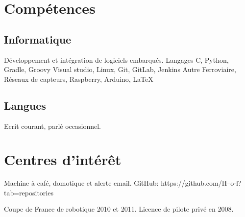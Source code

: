 \documentclass[10pt,a4paper]{moderncv}
\begin{document}
\section{Compétences}

  \subsection{Informatique}

    {Développement et intégration de logiciels embarqués.\newline{}}
    {Langages}
    {C, Python, Gradle, Groovy}
    {Visual studio, Linux, Git, GitLab, Jenkins\newline{}}
    {Autre}
    {Ferroviaire, Réseaux de capteurs, Raspberry, Arduino, \LaTeX} 

  \subsection{Langues}

    {\small Ecrit courant, parlé occasionnel.\newline{}}

  \section{Centres d'intérêt}
      {\small Machine à café, domotique et alerte email.\newline{}
              GitHub: https://github.com/H--o-l?tab=repositories\newline{}}

      {\small Coupe de France de robotique 2010 et 2011.\newline{}
              Licence de pilote privé en 2008.}
\end{document}
